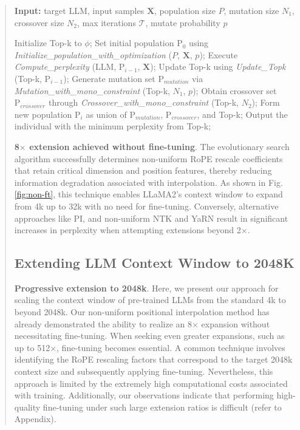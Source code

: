 \begin{abstract}
\begin{algorithm}[t]
	\small
	\caption{The search algorithm}
	\textbf{Input:} target LLM, input samples $\mathbf{X}$, population size $P$, mutation size $N_1$, crossover size $N_2$, max iterations $\mathcal{T}$, mutate probability $p$\\

	\begin{algorithmic}[1]
		\label{alg:search}
		\STATE Initialize Top-k to $\phi$;	
		\STATE Set initial population $\text{P}_0$ using \textit{Initialize\_population\_with\_optimization} ($P$, $\mathbf{X}$, $p$); 
		\STATE Execute \textit{Compute\_perplexity} (LLM, $\text{P}_{i-1}$, $\mathbf{X}$);
		\STATE Update Top-k using \textit{Update\_Topk} (Top-k, $\text{P}_{i-1}$);
		\STATE Generate mutation set $\text{P}_{mutation}$ via \textit{Mutation\_with\_mono\_constraint} (Top-k, $N_1$, $p$); 
		\STATE Obtain crossover set $\text{P}_{crossover}$ through \textit{Crossover\_with\_mono\_constraint} (Top-k, $N_2$);
		\STATE Form new population $\text{P}_i$ as union of $\text{P}_{mutation}$, $\text{P}_{crossover}$, and Top-k;
		\ENDFOR
		\STATE Output the individual with the minimum perplexity from Top-k;
	\end{algorithmic}
\end{algorithm}

\textbf{8$\times$ extension achieved without fine-tuning}. The evolutionary search algorithm successfully determines non-uniform RoPE rescale coefficients that retain critical dimension and position features, thereby reducing information degradation associated with interpolation. As shown in Fig.\ref{fig:non-ft}, this technique enables LLaMA2’s context window to expand from 4k up to 32k with no need for fine-tuning. Conversely, alternative approaches like PI, and non-uniform NTK and YaRN result in significant increases in perplexity when attempting extensions beyond 2$\times$.

\subsection{Extending LLM Context Window to 2048K}
\label{sec:extendto2048k}

\textbf{Progressive extension to 2048k}. Here, we present our approach for scaling the context window of pre-trained LLMs from the standard 4k to beyond 2048k. Our non-uniform positional interpolation method has already demonstrated the ability to realize an 8$\times$ expansion without necessitating fine-tuning. When seeking even greater expansions, such as up to 512$\times$, fine-tuning becomes essential. A common technique involves identifying the RoPE rescaling factors that correspond to the target 2048k context size and subsequently applying fine-tuning. Nevertheless, this approach is limited by the extremely high computational costs associated with training. Additionally, our observations indicate that performing high-quality fine-tuning under such large extension ratios is difficult (refer to Appendix).


\end{abstract}

